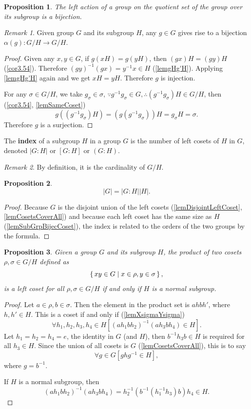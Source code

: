 \documentclass[12pt, letterpaper]{article}
\newtheorem{prop}{Proposition}[section]
\theoremstyle{definition}
\theoremstyle{remark}
\newtheorem*{rem*}{Remark}
\theoremstyle{definition}
\theoremstyle{plain}
\numberwithin{equation}{section}
\begin{document}
	\begin{prop}\label{lemBijectiveAction}
		The left action of a group on the quotient set of the group over its subgroup is a bijection.
	\end{prop}
	\begin{rem*}
		Given group $G$ and its subgroup $H$, any $g\in G$ gives rise to a bijection
		$\alpha(g)\colon G/H\to G/H$.
	\end{rem*}
	\begin{proof}
		Given any $x,y\in G$,
		if $g(xH)=g(yH)$, then 
		$(gx)H=(gy)H$ (\ref{cor3.54}). Therefore $(gy)^{-1}(gx)=y^{-1}x\in H$ (\ref{lemgHg'H}).
		Applying \ref{lemgHg'H} again and we get $xH = yH$. Therefore $g$ is injection.
		
		For any $\sigma\in G/H$, we take $g_\sigma\in\sigma$, 
		$\because g^{-1}g_\sigma\in G,\therefore (g^{-1}g_\sigma)H\in G/H$,
		then (\ref{cor3.54}, \ref{lemSameCoset})
		\[g((g^{-1}g_\sigma)H)= (g(g^{-1}g_\sigma))H=g_\sigma H=\sigma.\]
		Therefore $g$ is a surjection.
	\end{proof}

	\begin{def*}[index]
		The \textbf{index} of a subgroup $H$ in a group $G$ is the number of left cosets of $H$ in $G$,
		denoted $|G:H|$ or $[G:H]$ or $(G:H)$.		
	\end{def*}
	\begin{rem*}
		By definition, it is the cardinality of $G/H$.
	\end{rem*}
	\begin{prop}\label{prop|G|=|G:H||H|}
		 \[|G|=|G:H||H|.\]
	\end{prop}
	\begin{proof}
		Because $G$ is the disjoint union of the left cosets (\ref{lemDisjointLeftCoset}, \ref{lemCosetsCoverAll})
		and because each left coset has the same size as $H$ (\ref{lemSubGrpBijecCoset}),
		the index is related to the orders of the two groups by the formula.
	\end{proof}

	\begin{prop}
		Given a group $G$ and its subgroup $H$,
		the product of two cosets $\rho,\sigma\in G/H$ defined as
		\[\set{xy\in G|x\in\rho ,y\in\sigma},\]
		is a left coset for all $\rho,\sigma\in G/H$ if and only if $H$ is a normal subgroup.
	\end{prop}
	\begin{proof}
		Let $a\in \rho, b\in\sigma$. Then the element in the product set is
		$ahbh'$, where $h,h'\in H$. This is a coset if and only if (\ref{lemXsigmaYsigma})
		\[\forall h_1,h_2,h_3,h_4\in H[(ah_1bh_2)^{-1}(ah_3bh_4)\in H].
		\]
		Let $h_1=h_2=h_4=e$, the identity in $G$ (and $H$), then $b^{-1}h_3b\in H$ is required
		for all $h_3\in H$.
		Since the union of all cosets is $G$ (\ref{lemCosetsCoverAll}),
		this is to say
		\[\forall g \in G [ghg^{-1}\in H],\]
		where $g=b^{-1}$.
		
		If $H$ is a normal subgroup, then \[(ah_1bh_2)^{-1}(ah_3bh_4)=h_2^{-1}(b^{-1}(h_1^{-1}h_3)b)h_4\in H.\]
	\end{proof}
	
\end{document}
